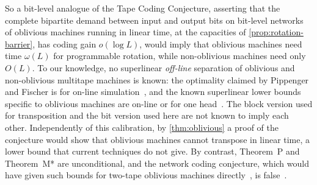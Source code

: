 So a bit-level analogue of the Tape Coding Conjecture, asserting that the complete bipartite demand between
input and output bits on bit-level networks of oblivious machines running in linear time, at the capacities of
\cref{prop:rotation-barrier}, has coding gain $o(\log L)$, would imply that oblivious machines need time
$\omega(L)$ for programmable rotation, while non-oblivious machines need only $O(L)$. To our knowledge, no superlinear \emph{off-line} separation of oblivious and non-oblivious multitape machines is known: the optimality
claimed by Pippenger and Fischer is for on-line simulation~\cite{PippengerFischer1979}, and the known
superlinear lower bounds specific to oblivious machines are on-line or for one head~\cite{Vitanyi1984}. The block
version used for transposition and the bit version used here are not known to imply each other.
Independently of this calibration, by \cref{thm:oblivious} a proof of the conjecture would show that oblivious
machines cannot transpose in linear time, a lower bound that current techniques do not give. By contrast, Theorem~P and Theorem~M* are unconditional, and
the network coding conjecture, which would have given such bounds for two-tape oblivious machines directly~\cite{AHJKL2006}, is
false~\cite{BravermanHe2026,ZhangLiLi2026}.

